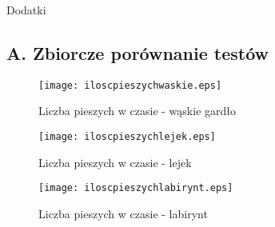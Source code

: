 \begin{titlepage}\centering
\vspace*{\fill}
\LARGE Dodatki
\vspace*{\fill}
\end{titlepage}

\begin{samepage}

\chapter{A. Zbiorcze porównanie testów}
\label{cha:dodatekA}

\begin{figure}
\label{figure:siatka}
\centering
\texttt{[image: iloscpieszychwaskie.eps]}
\caption{Liczba pieszych w czasie - wąskie gardło}
\end{figure}
\end{samepage}

\begin{figure}
\label{figure:siatka}
\centering
\texttt{[image: iloscpieszychlejek.eps]}
\caption{Liczba pieszych w czasie - lejek}
\end{figure}

\begin{figure}
\label{figure:siatka}
\centering
\texttt{[image: iloscpieszychlabirynt.eps]}
\caption{Liczba pieszych w czasie - labirynt}
\end{figure}
